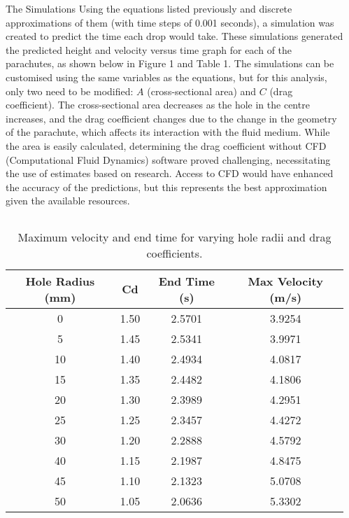 \documentclass[final]{beamer}
\newlength{\sepwidth}
\newlength{\colwidth}
\newcommand{\separatorcolumn}{\begin{column}{\sepwidth}\end{column}}
\begin{document}
\begin{frame}[t]
\begin{columns}[t]
\separatorcolumn

\begin{column}{\colwidth}

\begin{block}{The Simulations}
Using the equations listed previously and discrete approximations of them (with time steps of 0.001 seconds), a simulation was created to predict the time each drop would take. These simulations generated the predicted height and velocity versus time graph for each of the parachutes, as shown below in Figure 1 and Table 1. The simulations can be customised using the same variables as the equations, but for this analysis, only two need to be modified: $A$ (cross-sectional area) and $C$ (drag coefficient). The cross-sectional area decreases as the hole in the centre increases, and the drag coefficient changes due to the  change in the geometry of the parachute, which affects its interaction with the fluid medium. While the area is easily calculated, determining the drag coefficient without CFD (Computational Fluid Dynamics) software proved challenging, necessitating the use of estimates based on research. Access to CFD would have enhanced the accuracy of the predictions, but this represents the best approximation given the available resources.

\begin{columns}

    \begin{column}{0.5\textwidth}  %
        \begin{table}
        \centering
        \begin{tabular}{cccc}
        \toprule
        \textbf{Hole Radius (mm)} & \textbf{Cd} & \textbf{End Time (s)} & \textbf{Max Velocity (m/s)} \\
        \midrule
        0  & 1.50 & 2.5701 & 3.9254 \\
        5  & 1.45 & 2.5341 & 3.9971 \\
        10 & 1.40 & 2.4934 & 4.0817 \\
        15 & 1.35 & 2.4482 & 4.1806 \\
        20 & 1.30 & 2.3989 & 4.2951 \\
        25 & 1.25 & 2.3457 & 4.4272 \\
        30 & 1.20 & 2.2888 & 4.5792 \\
        40 & 1.15 & 2.1987 & 4.8475 \\
        45 & 1.10 & 2.1323 & 5.0708 \\
        50 & 1.05 & 2.0636 & 5.3302 \\
        \bottomrule
        \end{tabular}
        \caption{Maximum velocity and end time for varying hole radii and drag coefficients.}
        \end{table}
    \end{column}


\end{columns}
\end{block}
\end{column}
\end{columns}
\end{frame}
\end{document}
